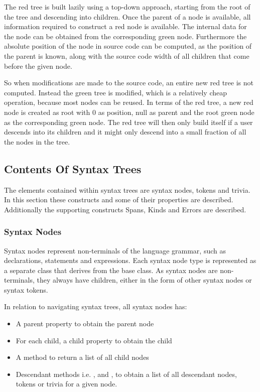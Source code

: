 The red tree is built lazily using a top-down approach, starting from the root of the tree and descending into children. Once the parent of a node is available, all information required to construct a red node is available. The internal data for the node can be obtained from the corresponding green node. Furthermore the absolute position of the node in source code can be computed, as the position of the parent is known, along with the source code width of all children that come before the given node\cite{sadovRoslynPerf}.

So when modifications are made to the source code, an entire new red tree is not computed. Instead the green tree is modified, which is a relatively cheap operation, because most nodes can be reused. In terms of the red tree, a new red node is created as root with 0 as position, null as parent and the root green node as the corresponding green node. The red tree will then only build itself if a user descends into its children and it might only descend into a small fraction of all the nodes in the tree\cite{sadovRoslynPerf}. %

\subsection{Contents Of Syntax Trees}
The elements contained within syntax trees are syntax nodes, tokens and trivia. In this section these constructs and some of their properties are described. Additionally the supporting constructs Spans, Kinds and Errors are described.

\subsubsection{Syntax Nodes}
Syntax nodes represent non-terminals of the language grammar, such as declarations, statements and expressions. Each syntax node type is represented as a separate class that derives from the base  class. As syntax nodes are non-terminals, they always have children, either in the form of other syntax nodes or syntax tokens.

In relation to navigating syntax trees, all syntax nodes has\cite[p. 7]{ng2012roslyn}:
\begin{itemize}
\item A parent property to obtain the parent node
\item For each child, a child property to obtain the child
\item A  method to return a list of all child nodes
\item Descendant methods i.e. ,  and , to obtain a list of all descendant nodes, tokens or trivia for a given node.
\end{itemize}

